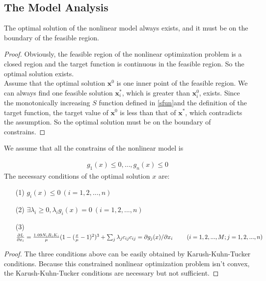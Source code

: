 \documentclass{mcmthesis}
\begin{document}
\subsection{The Model Analysis}
\begin{Theorem} \label{thm:latex}
The optimal solution of the nonlinear model always exists, and it must be on the boundary of the feasible region. 
\end{Theorem}
\begin{proof}
Obviously, the feasible region of the nonlinear optimization problem is a closed region and the target function is continuous in the feasible region. So the optimal solution exists.\\  
Assume that the optimal solution $\mathbf{x}^0$ is one inner point of the feasible region. We can always find one feasible solution $\mathbf{x}_i^*$, which is greater than $\mathbf{x}_i^0$, exists. Since the monotonically increasing $S$ function defined in \eqref{sfun}and the definition of the target function, the target value of $\mathbf{x}^0$ is less than that of $\mathbf{x}^*$, which contradicts the assumption. So the optimal solution must be on the boundary of constrains.
\end{proof}

\begin{Theorem} We assume that all the constrains of the nonlinear model is 

\begin{align}
g_1(x)\leq 0,
...,
g_n(x)\leq 0
\end{align}
The necessary conditions of the optimal solution $x$ are:
\begin{itemize}
\item[(1)]$g_i(x)\leq 0 \ (i=1,2,...,n)$
\item[(2)]$\exists \lambda_i \geq 0, \lambda_i g_i(x)=0 \ (i=1,2,...,n)$
\item[(3)]$\frac{\partial L}{\partial x_i}=\frac{1.09\*N_i\*R_i\*K_i}{\mu}\*(1-(\frac{x}{\mu}-1)^2)^3+\sum_j \lambda_j c_{ij} \\c_{ij}=\partial g_j(x)/\partial x_i\ \ \ \ \ \ \ (i=1,2,...,M;j=1,2,...,n)
$
\end{itemize}
\end{Theorem}

\begin{proof}
The three conditions above can be easily obtained by Karush-Kuhn-Tucker conditions. Because this constrained nonlinear optimization problem isn't convex, the Karush-Kuhn-Tucker conditions are necessary but not sufficient. 
\end{proof}
\end{document}
